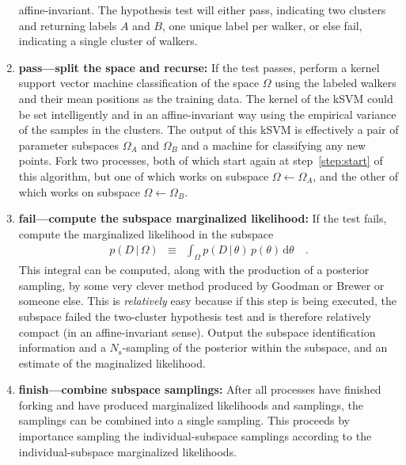 \documentclass[12pt]{article}
\newcommand{\given}{\,|\,}
\newcommand{\dd}{\mathrm{d}}
\newcommand{\data}{D}
\newcommand{\pars}{\theta}
\newcommand{\parspace}{\Omega}
\newcommand{\nsample}{N_{\mathrm{s}}}
\begin{document}
\begin{enumerate}
  affine-invariant. The hypothesis test will either pass, indicating
  two clusters and returning labels $A$ and $B$, one unique label per
  walker, or else fail, indicating a single cluster of walkers.
\item \textbf{pass---split the space and recurse:} If the test passes,
  perform a kernel support vector machine classification of the space
  $\parspace$ using the labeled walkers and their mean positions as
  the training data.  The kernel of the kSVM could be set
  intelligently and in an affine-invariant way using the empirical
  variance of the samples in the clusters.  The output of this kSVM is
  effectively a pair of parameter subspaces $\parspace_A$ and
  $\parspace_B$ and a machine for classifying any new points.  Fork
  two processes, both of which start again at step~\ref{step:start} of
  this algorithm, but one of which works on subspace
  $\parspace\leftarrow\parspace_A$, and the other of which works on
  subspace $\parspace\leftarrow\parspace_B$.
\item \textbf{fail---compute the subspace marginalized likelihood:} If
  the test fails, compute the marginalized likelihood in the subspace
  \begin{eqnarray}
    p(\data\given\parspace)
    &\equiv&
    \int_\parspace p(\data\given\pars)\,p(\pars)\,\dd\pars
    \quad .
  \end{eqnarray}
  This integral can be computed, along with the production of a
  posterior sampling, by some very clever method produced by Goodman
  or Brewer or someone else.  This is \emph{relatively} easy because
  if this step is being executed, the subspace failed the two-cluster
  hypothesis test and is therefore relatively compact (in an
  affine-invariant sense).  Output the subspace identification
  information and a $\nsample$-sampling of the posterior within the
  subspace, and an estimate of the maginalized likelihood.
\item \textbf{finish---combine subspace samplings:} After all
  processes have finished forking and have produced marginalized
  likelihoods and samplings, the samplings can be combined into a
  single sampling.  This proceeds by importance sampling the
  individual-subspace samplings according to the individual-subspace
  marginalized likelihoods.
\end{enumerate}
\end{document}
